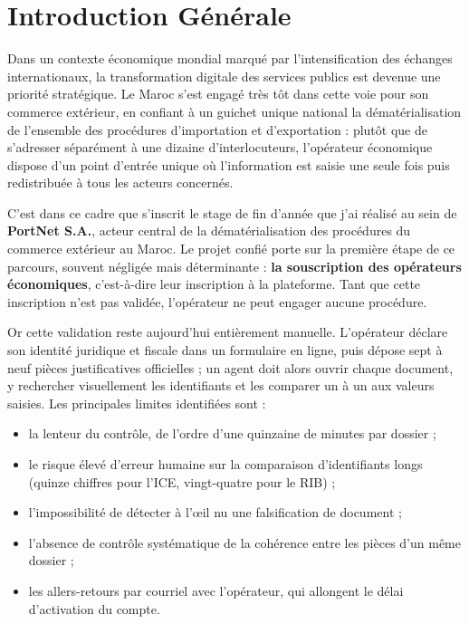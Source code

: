 \chapter*{Introduction G\'{e}n\'{e}rale}

Dans un contexte économique mondial marqué par l'intensification des échanges
internationaux, la transformation digitale des services publics est devenue une
priorité stratégique. Le Maroc s'est engagé très tôt dans cette voie pour son
commerce extérieur, en confiant à un guichet unique national la dématérialisation
de l'ensemble des procédures d'importation et d'exportation : plutôt que de
s'adresser séparément à une dizaine d'interlocuteurs, l'opérateur économique
dispose d'un point d'entrée unique où l'information est saisie une seule fois
puis redistribuée à tous les acteurs concernés.

C'est dans ce cadre que s'inscrit le stage de fin d'année que j'ai réalisé au sein
de \textbf{PortNet S.A.}, acteur central de la dématérialisation des procédures du
commerce extérieur au Maroc. Le projet confié porte sur la première étape de ce
parcours, souvent négligée mais déterminante : \textbf{la souscription des
opérateurs économiques}, c'est-à-dire leur inscription à la plateforme. Tant que
cette inscription n'est pas validée, l'opérateur ne peut engager aucune procédure.

Or cette validation reste aujourd'hui entièrement manuelle. L'opérateur déclare
son identité juridique et fiscale dans un formulaire en ligne, puis dépose sept à
neuf pièces justificatives officielles ; un agent doit alors ouvrir chaque
document, y rechercher visuellement les identifiants et les comparer un à un aux
valeurs saisies. Les principales limites identifiées sont :

\begin{itemize}[leftmargin=1.6cm,itemsep=2pt,topsep=4pt]
  \item la lenteur du contrôle, de l'ordre d'une quinzaine de minutes par dossier ;
  \item le risque élevé d'erreur humaine sur la comparaison d'identifiants longs
        (quinze chiffres pour l'ICE, vingt-quatre pour le RIB) ;
  \item l'impossibilité de détecter à l'\oe il nu une falsification de document ;
  \item l'absence de contrôle systématique de la cohérence entre les pièces d'un
        même dossier ;
  \item les allers-retours par courriel avec l'opérateur, qui allongent le délai
        d'activation du compte.
\end{itemize}

